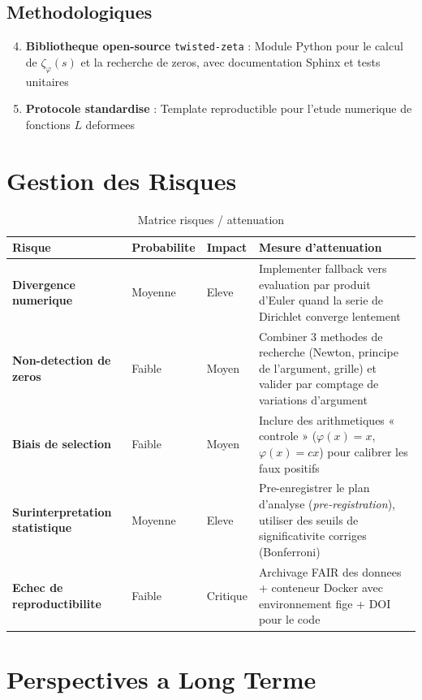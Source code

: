 \documentclass[11pt,a4paper]{article}
\begin{document}
	\subsection{Methodologiques}
	\begin{enumerate}
		\setcounter{enumi}{3}
		\item \textbf{Bibliotheque open-source} \texttt{twisted-zeta} : Module Python pour le calcul de $\zeta_\varphi(s)$ et la recherche de zeros, avec documentation Sphinx et tests unitaires
		\item \textbf{Protocole standardise} : Template reproductible pour l'etude numerique de fonctions $L$ deformees
	\end{enumerate}
	
	\section{Gestion des Risques}
	\label{sec:risques}
	
	\begin{table}[ht]
		\centering
		\caption{Matrice risques / attenuation}
		\label{tab:risques}
		\begin{tabular}{p{4cm}p{2cm}p{2cm}p{6cm}}
			\toprule
			\textbf{Risque} & \textbf{Probabilite} & \textbf{Impact} & \textbf{Mesure d'attenuation} \\
			\midrule
			\textbf{Divergence numerique} & Moyenne & Eleve & Implementer fallback vers evaluation par produit d'Euler quand la serie de Dirichlet converge lentement \\
			\textbf{Non-detection de zeros} & Faible & Moyen & Combiner 3 methodes de recherche (Newton, principe de l'argument, grille) et valider par comptage de variations d'argument \\
			\textbf{Biais de selection} & Faible & Moyen & Inclure des arithmetiques « controle » ($\varphi(x)=x$, $\varphi(x)=cx$) pour calibrer les faux positifs \\
			\textbf{Surinterpretation statistique} & Moyenne & Eleve & Pre-enregistrer le plan d'analyse (\textit{pre-registration}), utiliser des seuils de significativite corriges (Bonferroni) \\
			\textbf{Echec de reproductibilite} & Faible & Critique & Archivage FAIR des donnees + conteneur Docker avec environnement fige + DOI pour le code \\
			\bottomrule
		\end{tabular}
	\end{table}
	
	\section{Perspectives a Long Terme}
	\label{sec:perspectives}
	
\end{document}

